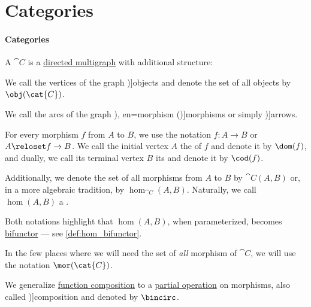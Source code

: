 \section{Categories}\label{sec:categories}

\paragraph{Categories}

\begin{definition}\label{def:category}
  A  \( \cat{C} \) is a \hyperref[def:directed_multigraph]{directed multigraph} with additional structure:

  \begin{thmenum}[series=def:category]
     We call the vertices of the graph \term[ru=объекты (\cite[def. I.1.1]{ЦаленкоШульгейфер1974ОсновыТеорииКатегорий})]{objects} and denote the set of all objects by \( \obj(\cat{C}) \).

     We call the arcs of the graph \term[ru=морфизм (\cite[def. I.1.1]{ЦаленкоШульгейфер1974ОсновыТеорииКатегорий}), en=morphism (\cite[def. 1.1.1]{Perrone2024StartingCategoryTheory})]{morphisms} or simply \term[en=arrows (\cite[def. 1.1.1]{Perrone2024StartingCategoryTheory})]{arrows}.

    For every morphism \( f \) from \( A \) to \( B \), we use the notation \( f: A \to B \) or \( A \reloset f \to B \). We call the initial vertex \( A \) the  of \( f \) and denote it by \( \dom(f) \), and dually, we call its terminal vertex \( B \) its  and denote it by \( \cod(f) \).

    Additionally, we denote the set of all morphisms from \( A \) to \( B \) by \( \cat{C}(A, B) \) or, in a more algebraic tradition, by \( \hom_{\cat{C}}(A, B) \). Naturally, we call \( \hom(A, B) \) a .

    Both notations highlight that \( \hom(A, B) \), when parameterized, becomes \hyperref[def:bifunctor]{bifunctor} --- see \cref{def:hom_bifunctor}.

    In the few places where we will need the set of \emph{all} morphism of \( \cat{C} \), we will use the notation \( \mor(\cat{C}) \).

     We generalize \hyperref[def:set_valued_function/composition]{function composition} to a \hyperref[def:partial_function]{partial operation} on morphisms, also called \term[ru=композиция (\cite[41]{Хелемский2014ФункциональныйАнализ})]{composition} and denoted by \( {\bincirc} \).


\end{thmenum}
\end{definition}
